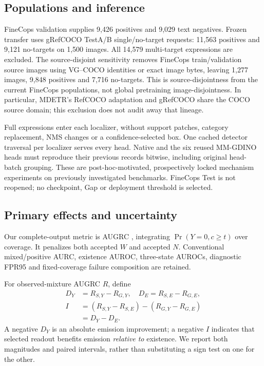 \documentclass[10pt,twocolumn,letterpaper]{article}
\begin{document}
\subsection{Populations and inference}
FineCops validation supplies 9,426 positives and 9,029 text negatives.
Frozen transfer uses gRefCOCO TestA/B single/no-target requests:
11,563 positives and 9,121 no-targets on 1,500 images.
All 14,579 multi-target expressions are excluded.
The source-disjoint sensitivity removes FineCops train/validation
source images using VG--COCO identities or exact image bytes, leaving
1,277 images, 9,848 positives and 7,716 no-targets.
This is source-disjointness from the current FineCops populations,
not global pretraining image-disjointness.
In particular, MDETR's RefCOCO adaptation and gRefCOCO share the
COCO source domain; this exclusion does not audit away that lineage.

Full expressions enter each localizer, without support patches,
category replacement, NMS changes or a confidence-selected box.
One cached detector traversal per localizer serves every head.
Native and the six reused MM-GDINO heads must reproduce their
previous records bitwise, including original head-batch grouping.
These are post-hoc-motivated, prospectively locked mechanism experiments
on previously investigated benchmarks. FineCops Test is not reopened;
no checkpoint, Gap or deployment threshold is selected.

\subsection{Primary effects and uncertainty}
Our complete-output metric is AUGRC
\cite{traub2024augrc}, integrating
$\Pr(Y=0,c\geq t)$ over coverage. It penalizes both accepted $W$
and accepted $N$. Conventional mixed/positive AURC, existence AUROC,
three-state AUROCs, diagnostic FPR95 and fixed-coverage failure
composition are retained.

For observed-mixture AUGRC $R$, define
\begin{align}
D_Y&=R_{S,Y}-R_{G,Y},\quad D_E=R_{S,E}-R_{G,E},\nonumber\\
I&=(R_{S,Y}-R_{S,E})-(R_{G,Y}-R_{G,E})\nonumber\\
 &=D_Y-D_E.
\end{align}
A negative $D_Y$ is an absolute emission improvement; a negative $I$
indicates that selected readout benefits emission \emph{relative to}
existence. We report both magnitudes and paired intervals, rather than
substituting a sign test on one for the other.
\end{document}
